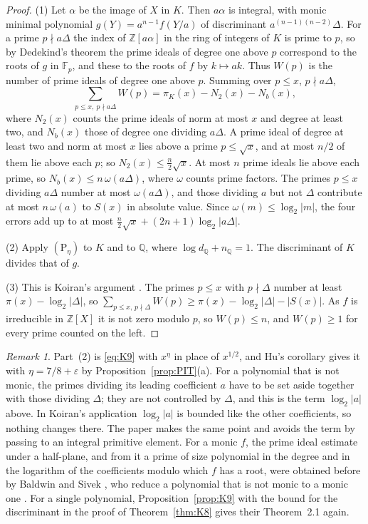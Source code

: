 \documentclass[11pt]{amsart}
\theoremstyle{definition}
\theoremstyle{remark}
\newtheorem{remark}[thm]{Remark}
\newcommand{\Z}{\mathbb Z}
\newcommand{\Q}{\mathbb Q}
\newcommand{\F}{\mathbb F}
\newcommand{\Ph}[1]{(\mathrm P_{#1})}
\begin{document}
\begin{proof}
(1) Let $\alpha$ be the image of $X$ in $K$. Then $a\alpha$ is integral, with monic minimal polynomial $g(Y)=a^{n-1}f(Y/a)$ of discriminant $a^{(n-1)(n-2)}\Delta$. For a prime $p\nmid a\Delta$ the index of $\Z[a\alpha]$ in the ring of integers of $K$ is prime to $p$, so by Dedekind's theorem the prime ideals of degree one above $p$ correspond to the roots of $g$ in $\F_p$, and these to the roots of $f$ by $k\mapsto ak$. Thus $W(p)$ is the number of prime ideals of degree one above $p$. Summing over $p\le x$, $p\nmid a\Delta$,
\[
 \sum_{p\le x,\ p\nmid a\Delta}W(p)=\pi_K(x)-N_2(x)-N_b(x),
\]
where $N_2(x)$ counts the prime ideals of norm at most $x$ and degree at least two, and $N_b(x)$ those of degree one dividing $a\Delta$. A prime ideal of degree at least two and norm at most $x$ lies above a prime $p\le\sqrt x$, and at most $n/2$ of them lie above each $p$; so $N_2(x)\le\frac n2\sqrt x$. At most $n$ prime ideals lie above each prime, so $N_b(x)\le n\,\omega(a\Delta)$, where $\omega$ counts prime factors. The primes $p\le x$ dividing $a\Delta$ number at most $\omega(a\Delta)$, and those dividing $a$ but not $\Delta$ contribute at most $n\,\omega(a)$ to $S(x)$ in absolute value. Since $\omega(m)\le\log_2|m|$, the four errors add up to at most $\frac n2\sqrt x+(2n+1)\log_2|a\Delta|$.

(2) Apply $\Ph\eta$ to $K$ and to $\Q$, where $\log d_\Q+n_\Q=1$. The discriminant of $K$ divides that of $g$.

(3) This is Koiran's argument \cite[Corollary~1, p.~282]{K96}. The primes $p\le x$ with $p\nmid\Delta$ number at least $\pi(x)-\log_2|\Delta|$, so $\sum_{p\le x,\,p\nmid\Delta}W(p)\ge\pi(x)-\log_2|\Delta|-|S(x)|$. As $f$ is irreducible in $\Z[X]$ it is not zero modulo $p$, so $W(p)\le n$, and $W(p)\ge1$ for every prime counted on the left.
\end{proof}

\begin{remark}\label{rem:monic}
Part~(2) is \eqref{eq:K9} with $x^{\eta}$ in place of $x^{1/2}$, and Hu's corollary gives it with $\eta=7/8+\varepsilon$ by Proposition~\ref{prop:PIT}(a). For a polynomial that is not monic, the primes dividing its leading coefficient $a$ have to be set aside together with those dividing $\Delta$; they are not controlled by $\Delta$, and this is the term $\log_2|a|$ above. In Koiran's application $\log_2|a|$ is bounded like the other coefficients, so nothing changes there. The paper \cite[\S17]{N} makes the same point and avoids the term by passing to an integral primitive element. For a monic $f$, the prime ideal estimate under a half-plane, and from it a prime of size polynomial in the degree and in the logarithm of the coefficients modulo which $f$ has a root, were obtained before by Baldwin and Sivek \cite[Corollary~3.3 and Theorem~2.1]{BS}, who reduce a polynomial that is not monic to a monic one \cite[\S5]{BS}. For a single polynomial, Proposition~\ref{prop:K9} with the bound for the discriminant in the proof of Theorem~\ref{thm:K8} gives their Theorem~2.1 again.
\end{remark}
\end{document}
